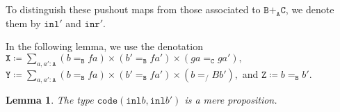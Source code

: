\documentclass[12pt]{amsart}
\newcommand{\bydef}{\coloneqq}
\newcommand{\type}[1]{\mathtt{#1}}
\newcommand{\A}{\type{A}}
\newcommand{\B}{\type{B}}
\newcommand{\C}{\type{C}}
\newcommand{\BAC}{\B +_{\A} \C}
\newcommand{\inl}{\type{inl}}
\newcommand{\inr}{\type{inr}}
\newcommand{\code}{\type{code}}
\newtheorem{lemma}{Lemma}
\theoremstyle{remark}
\theoremstyle{definition}
\begin{document}
To distinguish these pushout maps from those associated to \( \BAC \),
we denote them by \( \inl' \) and \( \inr' \).
\par

In the following lemma, we use the denotation
\(
    \type{X} \bydef
    \sum_{ a , a' : \A }
    ( b =_\B fa ) \times ( b' =_\B fa') \times ( ga =_\C ga' ),
\)
%
\(
    \type{Y} \bydef
    \sum_{ a , a' : \A }
    ( b =_\B fa ) \times ( b' =_\B fa' ) \times ( b =_/B b' ),
\)
%
and
%
\(
    \type{Z} \bydef b =_\B b'.
\)
\par


\begin{lemma} \label{thm:code-bb-isProp}
%
  The type
  \(
      \code ( \inl b , \inl b' )
  \)
  is a mere proposition.
%  
\end{lemma}
\end{document}
